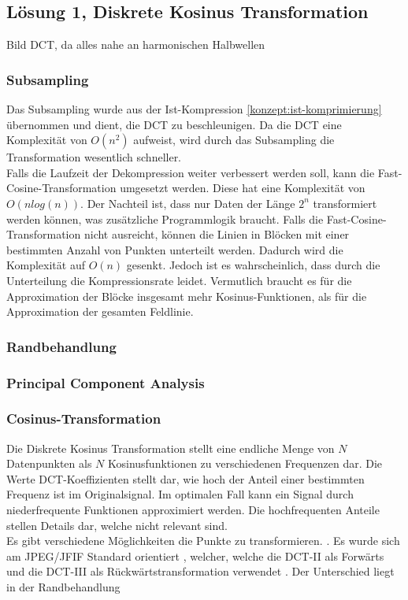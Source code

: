 \subsection{Lösung 1, Diskrete Kosinus Transformation}
Bild
DCT, da alles nahe an harmonischen Halbwellen

\subsubsection{Subsampling} \label{konzept:loesung1:subsampling}
Das Subsampling wurde aus der Ist-Kompression \ref{konzept:ist-komprimierung} übernommen und dient, die DCT zu beschleunigen. Da die DCT eine Komplexität von $O(n^2)$ aufweist, wird durch das Subsampling die Transformation wesentlich schneller.\\
Falls die Laufzeit der Dekompression weiter verbessert werden soll, kann die Fast-Cosine-Transformation umgesetzt werden. Diese hat eine Komplexität von $O(n log(n))$. Der Nachteil ist, dass nur Daten der Länge $2^n$ transformiert werden können, was zusätzliche Programmlogik braucht. Falls die Fast-Cosine-Transformation nicht ausreicht, können die Linien in Blöcken mit einer bestimmten Anzahl von Punkten unterteilt werden. Dadurch wird die Komplexität auf $O(n)$ gesenkt. Jedoch ist es wahrscheinlich, dass durch die Unterteilung die Kompressionsrate leidet. Vermutlich braucht es für die Approximation der Blöcke insgesamt mehr Kosinus-Funktionen, als für die Approximation der gesamten Feldlinie.\\

\subsubsection{Randbehandlung} \label{konzept:loesung1:randbehandlung}

\subsubsection{Principal Component Analysis}

\subsubsection{Cosinus-Transformation} \label{konzept:loesung1:kosinus}
Die Diskrete Kosinus Transformation stellt eine endliche Menge von $N$ Datenpunkten als $N$ Kosinusfunktionen zu verschiedenen Frequenzen dar. Die Werte DCT-Koeffizienten stellt dar, wie hoch der Anteil einer bestimmten Frequenz ist im Originalsignal. Im optimalen Fall kann ein Signal durch niederfrequente Funktionen approximiert werden. Die hochfrequenten Anteile stellen Details dar, welche nicht relevant sind.\\
Es gibt verschiedene Möglichkeiten die Punkte zu transformieren. . Es wurde sich am JPEG/JFIF Standard orientiert  , welcher, welche die DCT-II als Forwärts und die DCT-III als Rückwärtstransformation verwendet \cite{wallace1992jpeg}.
Der Unterschied liegt in der Randbehandlung

